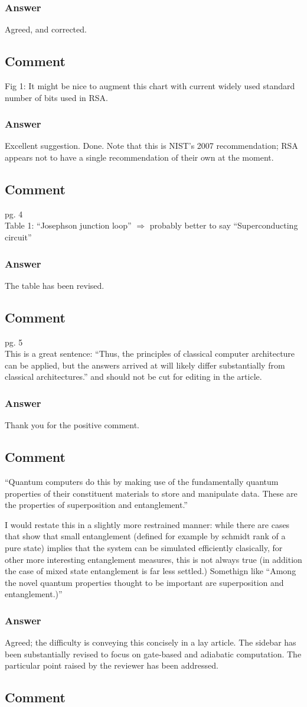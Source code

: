 \documentclass{article}
\newcommand{\comment}{\subsection{Comment}\em}
\newcommand{\answer}{\rm \subsubsection*{Answer}}
\begin{document}
\answer

Agreed, and corrected.

\comment

Fig 1: It might be nice to augment this chart with current widely used standard number of bits used in RSA.

\answer

Excellent suggestion.  Done.  Note that this is NIST's 2007
recommendation; RSA appears not to have a single recommendation of
their own at the moment.

\comment

pg. 4 \\
Table 1: ``Josephson junction loop'' $\Rightarrow$ probably better to say ``Superconducting circuit''

\answer

The table has been revised.

\comment

pg. 5\\
This is a great sentence: ``Thus, the principles of classical computer
architecture can be applied, but the answers arrived at will likely
differ substantially from classical architectures.'' and should not be
cut for editing in the article.

\answer

Thank you for the positive comment.

\comment

``Quantum computers do this by making use of the fundamentally quantum
properties of their constituent materials to store and manipulate
data. These are the properties of superposition and entanglement.''

I would restate this in a slightly more restrained manner: while there
are cases that show that small entanglement (defined for example by
schmidt rank of a pure state) implies that the system can be simulated
efficiently clasically, for other more interesting entanglement
measures, this is not always true (in addition the case of mixed state
entanglement is far less settled.)  Somethign like ``Among the novel
quantum properties thought to be important are superposition and
entanglement.)''

\answer

Agreed; the difficulty is conveying this concisely in a lay article.
The sidebar has been substantially revised to focus on gate-based and
adiabatic computation.  The particular point raised by the reviewer
has been addressed.


\comment
\end{document}
